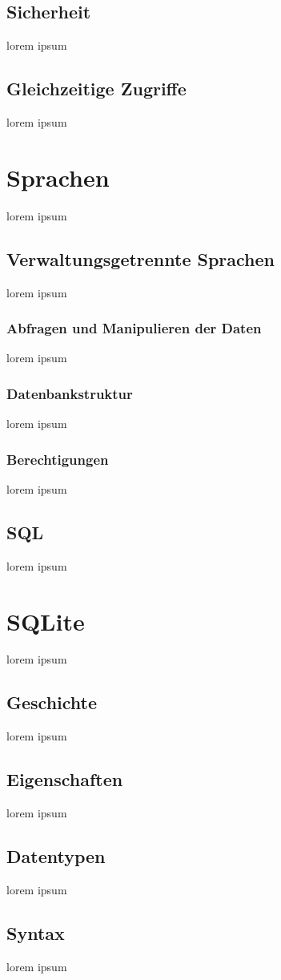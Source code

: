\documentclass[12pt,a4paper]{report}
\begin{document}
\subsection{Sicherheit}
lorem ipsum
\subsection{Gleichzeitige Zugriffe}
lorem ipsum 
\section{Sprachen}
lorem ipsum
\subsection{Verwaltungsgetrennte Sprachen}
lorem ipsum
\subsubsection{Abfragen und Manipulieren der Daten}
lorem ipsum
\subsubsection{Datenbankstruktur}
lorem ipsum
\subsubsection{Berechtigungen}
lorem ipsum
\subsection{SQL}
lorem ipsum
\section{SQLite}
lorem ipsum
\subsection{Geschichte}
lorem ipsum
\subsection{Eigenschaften}
lorem ipsum
\subsection{Datentypen}
lorem ipsum
\subsection{Syntax}
lorem ipsum 
\end{document}
